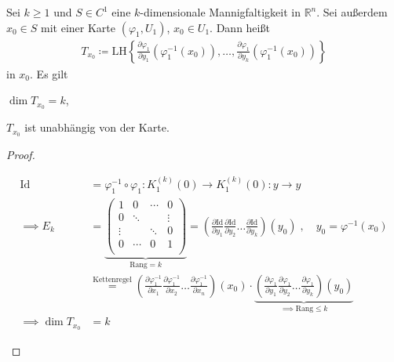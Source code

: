 \documentclass[a4paper,10pt]{scrbook}
\begin{document}
\begin{theorem}[Satz] \label{thm:9.7}
  Sei $k \geq 1$ und $S \in C^1$ eine $k$-dimensionale Mannigfaltigkeit in $\mathbb{R}^n$. Sei außerdem $x_0 \in S$ mit einer Karte $(\varphi_1,U_1)$, $x_0 \in U_1$. Dann heißt
  \begin{align*}
    T_{x_0} \coloneq \mathrm{LH} \left\{ \frac{\partial \varphi_1}{\partial y_1} \left(\varphi_1^{-1}(x_0)\right) , \ldots , \frac{\partial \varphi_1}{\partial y_k} \left(\varphi_1^{-1}(x_0)\right) \right\}
  \end{align*}
   in $x_0$. Es gilt
  \begin{enum-alph}
    \item $\dim T_{x_0} = k$,

    \item $T_{x_0}$ ist unabhängig von der Karte.
  \end{enum-alph}
  \begin{proof}
    \begin{enum-alph}
      \item
      \begin{align*}
        \mathrm{Id} &= \varphi_1^{-1} \circ \varphi_1 : K_1^{(k)}(0) \to K_1^{(k)}(0) : y \to y \\
        \implies E_k &=
        \underbrace{
        \begin{pmatrix}
          1 & 0 & \cdots & 0 \\
          0 & \ddots & & \vdots \\
          \vdots & & \ddots & 0 \\
          0 & \cdots & 0 & 1 \\
        \end{pmatrix}
        }_{\mathrm{Rang}=k}
        = \left( \frac{\partial \mathrm{Id}}{\partial y_1} \frac{\partial \mathrm{Id}}{\partial y_2} \ldots \frac{\partial \mathrm{Id}}{\partial y_k} \right)(y_0) \; , \quad y_0 = \varphi^{-1}(x_0) \\
        &\overset{\text{Kettenregel}}{=} \left( \frac{\partial \varphi_1^{-1}}{\partial x_1} \frac{\partial \varphi_1^{-1}}{\partial x_2} \ldots \frac{\partial \varphi_1^{-1}}{\partial x_n} \right)(x_0)
        \cdot
        \underbrace{\left( \frac{\partial \varphi_1}{\partial y_1} \frac{\partial \varphi_1}{\partial y_2} \ldots \frac{\partial \varphi_1}{\partial y_k} \right)(y_0)}_{\implies \mathrm{Rang} \leq k} \\
        \implies \dim T_{x_0} &= k
      \end{align*}


\end{enum-alph}
\end{proof}
\end{theorem}
\end{document}
